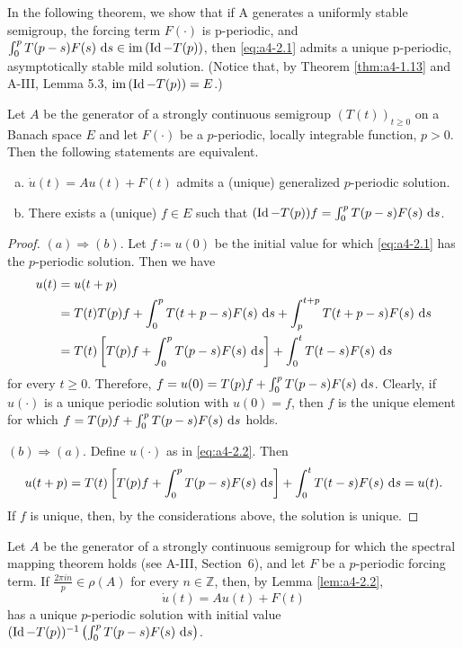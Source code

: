 In the following theorem, we show that if A generates a
uniformly stable semigroup, the forcing term $F(\cdot)$ is p-periodic,
and $\int_{0}^{p} T(p-s)F(s) \,\mathop{}\!\mathrm{d}{s} \in \mathop{}\!\mathrm{im}\,(\operatorname{Id} - T(p))$, then \eqref{eq:a4-2.1}
admits a unique p-periodic, asymptotically stable mild solution. (Notice that, by
Theorem \ref{thm:a4-1.13} and A-III, Lemma 5.3, $\mathop{}\!\mathrm{im}\,(\operatorname{Id} - T(p)) = E$.)

\begin{lemma}\label{lem:a4-2.2}
Let $A$ be the generator of a strongly continuous semigroup $(T(t))_{t \geq 0}$ on a Banach space $E$ and let $F(\cdot)$ be a $p$-periodic, locally integrable function, $p > 0$. 
Then the following statements are equivalent.
\begin{enumerate}[(a)]
\item $\dot{u}(t) = Au(t) + F(t)$ admits a (unique) generalized $p$-periodic solution.
\item There exists a (unique) $f \in E$ such that $(\operatorname{Id} - T(p))f = \int_{0}^{p} T(p-s)F(s) \,\mathop{}\!\mathrm{d}{s}$.
\end{enumerate}
\end{lemma}

\begin{proof}
$(a) \Rightarrow (b)$. 
Let $f \coloneqq u(0)$ be the initial value for which \eqref{eq:a4-2.1} has the $p$-periodic solution. 
Then we have
\begin{align*}
u(t) &= u(t+p) \\
&= T(t)T(p)f + \int_{0}^{p} T(t+p-s)F(s) \,\mathop{}\!\mathrm{d}{s} + \int_{p}^{t+p} T(t+p-s)F(s) \,\mathop{}\!\mathrm{d}{s} \\
&= T(t)\left[T(p)f + \int_{0}^{p} T(p-s)F(s) \,\mathop{}\!\mathrm{d}{s}\right] + \int_{0}^{t} T(t-s)F(s) \,\mathop{}\!\mathrm{d}{s}
\end{align*}
for every $t \geq 0$. 
Therefore, $f = u(0) = T(p)f + \int_{0}^{p} T(p-s)F(s) \,\mathop{}\!\mathrm{d}{s}$.
Clearly, if $u(\cdot)$ is a unique periodic solution with $u(0) = f$, then $f$ is the unique element for which $f = T(p)f + \int_{0}^{p} T(p-s)F(s) \,\mathop{}\!\mathrm{d}{s}$ holds.


$(b) \Rightarrow (a)$. 
Define $u(\cdot)$ as in \eqref{eq:a4-2.2}. 
Then
\begin{align*}
u(t+p) = T(t)\left[T(p)f + \int_{0}^{p} T(p-s)F(s) \,\mathop{}\!\mathrm{d}{s}\right] + \int_{0}^{t} T(t-s)F(s) \,\mathop{}\!\mathrm{d}{s} = u(t).
\end{align*}
If $f$ is unique, then, by the considerations above, the solution is unique.
\end{proof}

\begin{remark}\label{rem:a4-2.3}
Let $A$ be the generator of a strongly continuous semigroup for which the spectral mapping theorem holds (see A-III, Section~6), and let $F$ be a $p$-periodic forcing term.
If $\frac{2\pi in}{p} \in \rho(A)$ for every $n \in \mathbb{Z}$, then, by Lemma \ref{lem:a4-2.2}, 
\[\textstyle{ 
\dot{u}(t) = Au(t) + F(t)
}\]
has a unique $p$-periodic solution with initial value $(\operatorname{Id} - T(p))^{-1} \left(\int_{0}^{p} T(p-s)F(s) \,\mathop{}\!\mathrm{d}{s}\right)$.
\end{remark}

